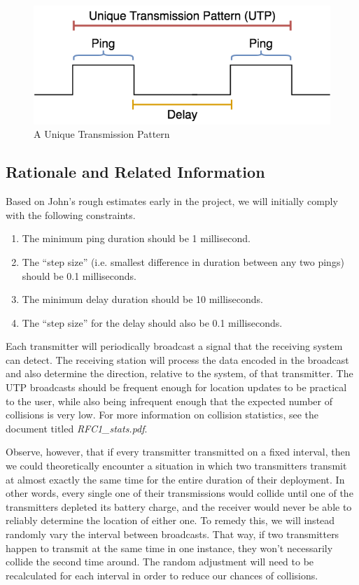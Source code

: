 \documentclass[12pt]{article}
\begin{document}
\begin{figure}[h]
\centering
\includegraphics[scale=0.5]{utp}

\caption{A Unique Transmission Pattern}\label{fig:utp}
\end{figure}

\subsection{Rationale and Related Information} \label{rationale}

Based on John's rough estimates early in the project, we will initially
comply with the following constraints.

\begin{enumerate} \itemsep -2pt
	\item The minimum ping duration should be 1 millisecond.
	\item The ``step size'' (i.e. smallest difference in duration between
		any two pings) should be 0.1 milliseconds.
	\item The minimum delay duration should be 10 milliseconds.
	\item The ``step size'' for the delay should also be 0.1 milliseconds.
\end{enumerate}

Each transmitter will periodically broadcast a signal that the receiving
system can detect.
The receiving station will process the data encoded in the broadcast and
also determine the direction, relative to the system, of that transmitter.
The UTP broadcasts should be frequent enough for location updates to be
practical to the user, while also being
infrequent enough that the expected number of collisions is very low.
For more information on collision statistics, see the document titled
{\em RFC1\_stats.pdf}.

Observe, however, that if every transmitter transmitted on a fixed interval,
then we could theoretically encounter a situation in which two transmitters
transmit at almost exactly the same time for the entire duration of their
deployment.
In other words, every single one of their transmissions would collide
until one of the transmitters depleted its battery charge, and the receiver
would never be able to reliably determine the location of either one.
To remedy this, we will instead randomly vary the interval between broadcasts.
That way, if two transmitters happen to transmit at the same time in one
instance, they won't necessarily collide the second time around.
The random adjustment will need to be recalculated for each interval in order
to reduce our chances of collisions.
\end{document}
